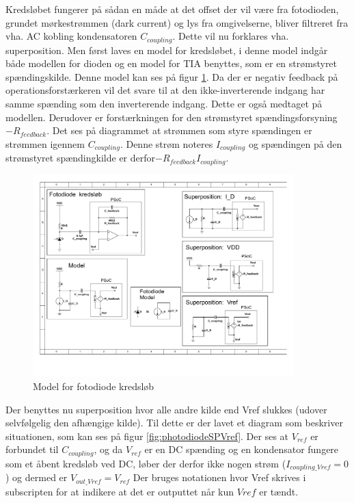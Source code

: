 \documentclass[HardwareDesign/HardwareDesign_main.tex]{subfiles}
\begin{document}
Kredsløbet fungerer på sådan en måde at det offset der vil være fra fotodioden, grundet mørkestrømmen (dark current) og lys fra omgivelserne, bliver filtreret fra vha. AC kobling kondensatoren $C_{coupling}$. Dette vil nu forklares vha. superposition. Men først laves en model for kredsløbet, i denne model indgår både modellen for dioden og en model for TIA benyttes, som er en strømstyret spændingskilde. Denne model kan ses på figur \ref{fig:photodiodeCircuitModel}. 
Da der er negativ feedback på operationsforstærkeren vil det svare til at den ikke-inverterende indgang har samme spænding som den inverterende indgang. Dette er også medtaget på modellen. Derudover er forstærkningen for den strømstyret spændingsforsyning $-R_{feedback}$. Det ses på diagrammet at strømmen som styre spændingen er strømmen igennem $C_{coupling}$. Denne strøm noteres $I_{coupling}$ og spændingen på den strømstyret spændingkilde er derfor$-R_{feedback} I_{coupling}$.

\begin{figure}[H]
    \centering
    \includegraphics[width=0.9\textwidth,trim={0.6in 2.4in 7in 3.5in},clip, page=1]{HardwareDesign/CupSensor/graphics/Superposition.pdf}
    \caption{Model for fotodiode kredsløb}
    \label{fig:photodiodeCircuitModel}
\end{figure}

Der benyttes nu superposition hvor alle andre kilde end Vref slukkes (udover selvfølgelig den afhængige kilde). Til dette er der lavet et diagram som beskriver situationen, som kan ses på figur \ref{fig:photodiodeSPVref}. Der ses at $V_{ref}$ er forbundet til $C_{coupling}$, og da $V_{ref}$ er en DC spænding og en kondensator fungere som et åbent kredsløb ved DC, løber der derfor ikke nogen strøm ($I_{coupling\_Vref}=0$) og dermed er $V_{out\_Vref}=V_{ref}$ Der bruges notationen hvor Vref skrives i subscripten for at indikere at det er outputtet når kun $Vref$ er tændt.
\end{document}
